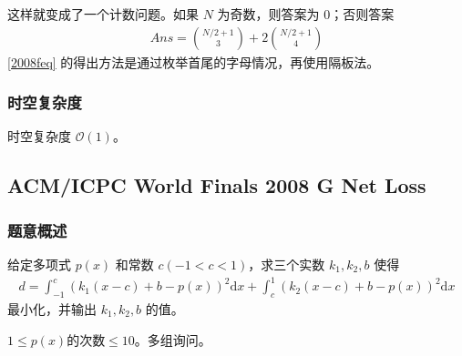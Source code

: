 				这样就变成了一个计数问题。如果 $N$ 为奇数，则答案为 $0$；否则答案
				\begin{align}
					Ans = \binom{N/2 + 1}{3} + 2 \binom{N/2 + 1}{4} \label{2008feq}
				\end{align}
				\eqref{2008feq} 的得出方法是通过枚举首尾的字母情况，再使用隔板法。
					
			\subsubsection{时空复杂度}
				时空复杂度 $\mathcal{O}\left(1\right)$。


		\newpage
\subsection{ACM/ICPC World Finals 2008 G Net Loss}
		\subsubsection{题意概述}
			给定多项式 $p(x)$ 和常数 $c \left(-1 < c < 1\right)$，求三个实数 $k_1,k_2,b$ 使得
			\begin{align}
				d = \int_{-1}^{c} \left(k_1\left(x-c\right)+b - p(x)\right)^2 \mathrm{d}x
					+ \int_{c}^{1} \left(k_2\left(x-c\right)+b - p(x)\right)^2 \mathrm{d}x 
			\end{align}
			最小化，并输出 $k_1,k_2,b$ 的值。
			
			$1 \le p(x) \text{的次数} \le 10$。多组询问。
			
